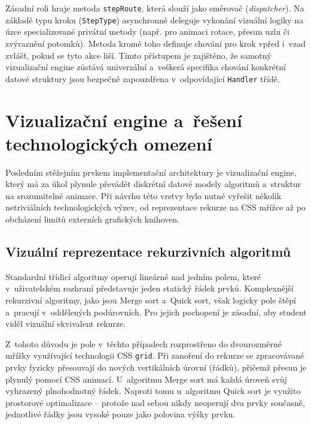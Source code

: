 \begin{listing}[ht]
    \inputminted{typescript}{code/implementation/stepHandlerBase.ts}
    \caption{Abstraktní rozhraní StepHandlerBase definující životní cyklus vizualizace kroku}
    \label{code:step_handler_base}
\end{listing}

Zásadní roli hraje metoda \texttt{stepRoute}, která slouží jako směrovač (\textit{dispatcher}).
Na základě typu kroku (\texttt{StepType}) asynchronně deleguje vykonání vizuální logiky na úzce specializované privátní metody (např. pro animaci rotace, přesun uzlu či zvýraznění potomků).
Metoda kromě toho definuje chování pro krok vpřed i~vzad zvlášť, pokud se tyto akce liší.
Tímto přístupem je zajištěno, že samotný vizualizační engine zůstává univerzální a~veškerá specifika chování konkrétní datové struktury jsou bezpečně zapouzdřena v~odpovídající \texttt{Handler} třídě.

\section{Vizualizační engine a~řešení technologických omezení}
\label{sec:visualization-engine}

Posledním stěžejním prvkem implementační architektury je vizualizační engine, který má za úkol plynule převádět diskrétní datové modely algoritmů a~struktur na srozumitelné animace.
Při návrhu této vrstvy bylo nutné vyřešit několik netriviálních technologických výzev, od reprezentace rekurze na CSS mřížce až po obcházení limitů externích grafických knihoven.

\subsection{Vizuální reprezentace rekurzivních algoritmů}
\label{subsec:recursion-viz}

Standardní třídicí algoritmy operují lineárně nad jedním polem, které v~uživatelském rozhraní představuje jeden statický řádek prvků.
Komplexnější rekurzivní algoritmy, jako jsou Merge sort a~Quick sort, však logicky pole štěpí a~pracují v~oddělených podúrovních.
Pro jejich pochopení je zásadní, aby student viděl vizuální ekvivalent rekurze.

Z~tohoto důvodu je pole v~těchto případech rozprostřeno do dvourozměrné mřížky využívající technologii CSS \texttt{grid}.
Při zanoření do rekurze se zpracovávané prvky fyzicky přesouvají do nových vertikálních úrovní (řádků), přičemž přesun je plynulý pomocí CSS animací.
U~algoritmu Merge sort má každá úroveň svůj vyhrazený plnohodnotný řádek.
Naproti tomu u~algoritmu Quick sort je využito prostorové optimalizace -- protože nad sebou nikdy neoperují dva prvky současně, jednotlivé řádky jsou vysoké pouze jako polovina výšky prvku.


